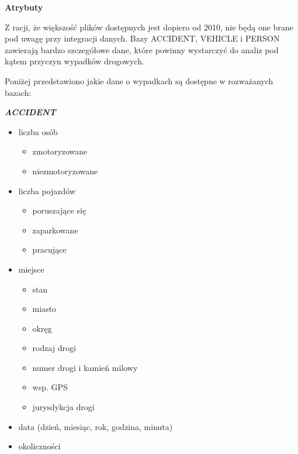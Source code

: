 \textbf{Atrybuty}

Z racji, że większość plików dostępnych jest dopiero od 2010, nie będą
one brane pod uwagę przy integracji danych. Bazy ACCIDENT, VEHICLE i
PERSON zawierają bardzo szczegółowe dane, które powinny wystarczyć do
analiz pod kątem przyczyn wypadków drogowych.

Poniżej przedstawiono jakie dane o wypadkach są dostępne w rozważanych
bazach:

\emph{\textbf{ACCIDENT}}

\begin{itemize}
\item
  liczba osób

  \begin{itemize}
  \itemsep-14pt\parskip0pt
  \item
    zmotoryzowane\\
  \item
    niezmotoryzowane\\
  \end{itemize}
\item
  liczba pojazdów

  \begin{itemize}
  \itemsep-14pt\parskip0pt
  \item
    poruszające się\\
  \item
    zaparkowane\\
  \item
    pracujące\\
  \end{itemize}
\item
  miejsce

  \begin{itemize}
  \itemsep-14pt\parskip0pt
  \item
    stan\\
  \item
    miasto\\
  \item
    okręg\\
  \item
    rodzaj drogi\\
  \item
    numer drogi i kamień milowy\\
  \item
    wsp. GPS\\
  \item
    jurysdykcja drogi\\
  \end{itemize}
\item
  data (dzień, miesiąc, rok, godzina, minuta)\\
\item
  okoliczności


\end{itemize}
